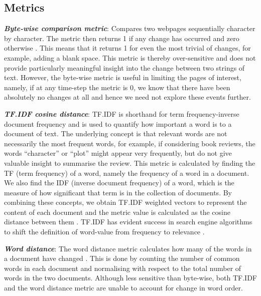 \documentclass[10pt, a4paper]{article}
\begin{document}
\subsection{Metrics}
\vspace{-2mm}
\textit{\textbf{Byte-wise comparison metric}}:
Compares two webpages sequentially character by character. The metric then returns 1 if any change has occurred and zero otherwise \cite{brewington2000dynamic, cho1999evolution,kim2005empirical}. This means that it returns 1 for even the most trivial of changes, for example, adding a blank space. This metric is thereby over-sensitive and does not provide particularly meaningful insight into the change between two strings of text. However, the byte-wise metric is useful in limiting the pages of interest, namely, if at any time-step the metric is 0, we know that there have been absolutely no changes at all and hence we need not explore these events further.
\vspace{1.5mm}

\noindent \textit{\textbf{TF.IDF cosine distance}}:
TF.IDF is shorthand for term frequency-inverse document frequency and is used to quantify how important a word is to a document of text. The underlying concept is that relevant words are not necessarily the most frequent words, for example, if considering book reviews, the words ``character'' or ``plot'' might appear very frequently, but do not give valuable insight to summarise the review. 
This metric is calculated by finding the TF (term frequency) of a word, namely the frequency of a word in a document. We also find the IDF (inverse document frequency) of a word, which is the measure of how significant that term is in the collection of documents. By combining these concepts, we obtain TF.IDF weighted vectors to represent the content of each document and the metric value is calculated as the cosine distance between them \cite{salton1986introduction}.
TF.IDF has evident success in search engine algorithms to shift the definition of word-value from frequency to relevance \cite{beel2016paper}.

\vspace{1.5mm}
\noindent \textit{\textbf{Word distance}}:
The word distance metric calculates how many of the words in a document have changed \cite{ntoulas2004s}. This is done by counting the number of common words in each document and normalising with respect to the total number of words in the two documents.
Although less sensitive than byte-wise, both TF.IDF and the word distance metric are unable to account for change in word order. 
\end{document}
